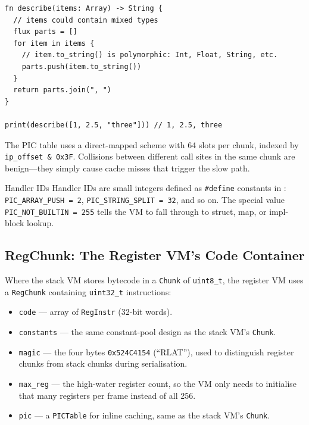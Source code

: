 \begin{lstlisting}[language=Lattice, caption={A polymorphic call site}]
fn describe(items: Array) -> String {
  // items could contain mixed types
  flux parts = []
  for item in items {
    // item.to_string() is polymorphic: Int, Float, String, etc.
    parts.push(item.to_string())
  }
  return parts.join(", ")
}

print(describe([1, 2.5, "three"])) // 1, 2.5, three
\end{lstlisting}

The PIC table uses a direct-mapped scheme with 64 slots per chunk, indexed by
\lstinline|ip_offset & 0x3F|. Collisions between different call sites in the
same chunk are benign---they simply cause cache misses that trigger the slow
path.

\begin{notebox}{Handler IDs}
Handler IDs are small integers defined as \lstinline|#define| constants in
: \lstinline|PIC_ARRAY_PUSH = 2|,
\lstinline|PIC_STRING_SPLIT = 32|, and so on. The special value
\lstinline|PIC_NOT_BUILTIN = 255| tells the VM to fall through to struct, map,
or impl-block lookup.
\end{notebox}

\subsection{RegChunk: The Register VM's Code Container}

Where the stack VM stores bytecode in a \lstinline|Chunk| of
\lstinline|uint8_t|, the register VM uses a \lstinline|RegChunk| containing
\lstinline|uint32_t| instructions:

\begin{itemize}
  \item \lstinline|code| --- array of \lstinline|RegInstr| (32-bit words).
  \item \lstinline|constants| --- the same constant-pool design as the stack
        VM's \lstinline|Chunk|.
  \item \lstinline|magic| --- the four bytes \texttt{0x524C4154} (``RLAT''),
        used to distinguish register chunks from stack chunks during
        serialisation.
  \item \lstinline|max_reg| --- the high-water register count, so the VM only
        needs to initialise that many registers per frame instead of all 256.
  \item \lstinline|pic| --- a \lstinline|PICTable| for inline caching, same as
        the stack VM's \lstinline|Chunk|.
\end{itemize}

